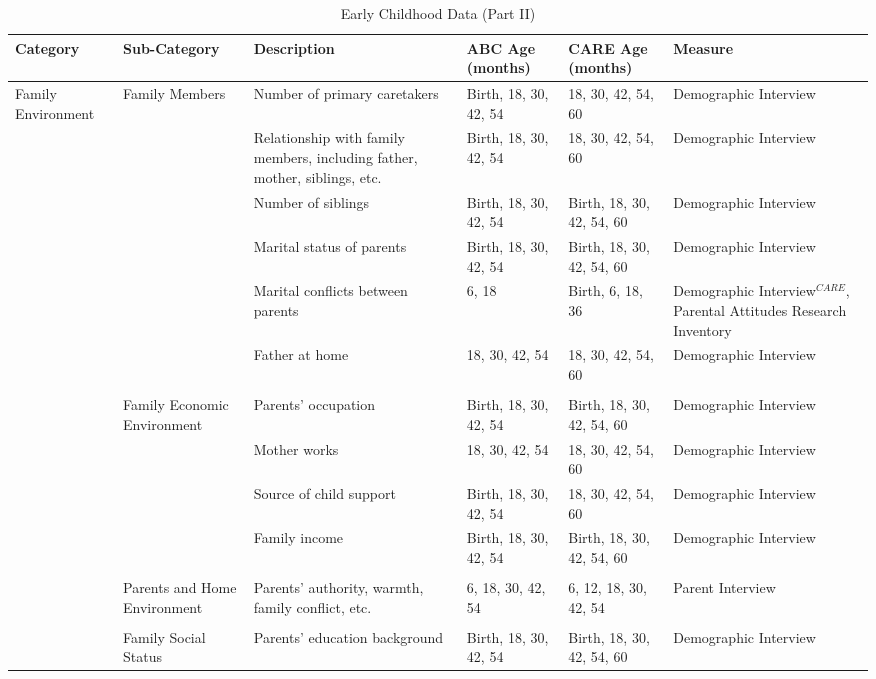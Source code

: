 \begin{sidewaystable}[H]
\small
\caption{Early Childhood Data (Part II)}
\label{tab:ecvars_2}
\centering
\begin{adjustbox}{max width=\textwidth, max height=\textheight,keepaspectratio}
\begin{threeparttable}
\tiny
\begin{tabular}{L{3cm} C{3.5cm} C{4cm} C{1.5cm} C{1.5cm}  C{6cm}}
\toprule
\textbf{Category}	&	\textbf{Sub-Category}	&	\textbf{Description}	&	\textbf{ABC Age (months)}  	&  \textbf{CARE Age (months)}  & 	\textbf{Measure}	\\ \midrule
Family Environment	&	Family Members	&	Number of primary caretakers	&	Birth, 18, 30, 42, 54	&	18, 30, 42, 54, 60	&	Demographic Interview	\\
	&		&	Relationship with family members, including father, mother, siblings, etc.	&	Birth, 18, 30, 42, 54	&	18, 30, 42, 54, 60	&	Demographic Interview	\\
	&		&	Number of siblings	&	Birth, 18, 30, 42, 54	&	Birth, 18, 30, 42, 54, 60	&	Demographic Interview	\\
	&		&	Marital status of parents	&	Birth, 18, 30, 42, 54	&	Birth, 18, 30, 42, 54, 60	&	Demographic Interview	\\
	&		&	Marital conflicts between parents	&	6, 18	&	Birth, 6, 18, 36	&	Demographic Interview$^{CARE}$, Parental Attitudes Research Inventory	\\
	&		& Father at home & 18, 30, 42, 54  & 18, 30, 42, 54, 60 & Demographic Interview \\
	&	\\
	&	Family Economic Environment	&	Parents' occupation	&	Birth, 18, 30, 42, 54	& 	Birth, 18, 30, 42, 54, 60		&	Demographic Interview	\\
	&								& Mother works & 18, 30, 42, 54 & 18, 30, 42, 54, 60 & Demographic Interview \\
	&		&	Source of child support	&	Birth, 18, 30, 42, 54	&	18, 30, 42, 54, 60	&	Demographic Interview	\\
	&		&	Family income	&	Birth, 18, 30, 42, 54	&	Birth, 18, 30, 42, 54, 60	&	Demographic Interview	\\
	&	\\
	&	Parents and Home Environment & Parents' authority, warmth, family conflict, etc. & 6, 18, 30, 42, 54 & 6, 12, 18, 30, 42, 54 & Parent Interview \\
	&	\\
	&	Family Social Status	&	Parents' education background	&	Birth, 18, 30, 42, 54	&	Birth, 18, 30, 42, 54, 60		&	Demographic Interview	\\

\end{tabular}
\end{threeparttable}
\end{adjustbox}
\end{sidewaystable}
